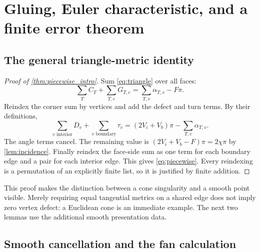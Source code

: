 \section{Gluing, Euler characteristic, and a finite error theorem}\label{sec:global}

\subsection{The general triangle-metric identity}

\begin{proof}[Proof of \cref{thm:piecewise_intro}]
Sum \eqref{eq:triangle} over all faces:
\[
\sum_TC_T+\sum_{T,e}G_{T,e}
=\sum_{T,v}\alpha_{T,v}-F\pi.
\]
Reindex the corner sum by vertices and add the defect and turn terms. By their definitions,
\[
\sum_{v\text{ interior}}D_v+\sum_{v\text{ boundary}}\tau_v
=(2V_i+V_b)\pi-\sum_{T,v}\alpha_{T,v}.
\]
The angle terms cancel. The remaining value is
$(2V_i+V_b-F)\pi=2\chi\pi$ by \cref{lem:incidence}.
Finally reindex the face-side sum as one term for each boundary edge and a pair for each interior edge. This gives \eqref{eq:piecewise}. Every reindexing is a permutation of an explicitly finite list, so it is justified by finite addition.
\end{proof}

This proof makes the distinction between a cone singularity and a smooth point visible. Merely requiring equal tangential metrics on a shared edge does not imply zero vertex defect: a Euclidean cone is an immediate example. The next two lemmas use the additional smooth presentation data.

\subsection{Smooth cancellation and the fan calculation}\label{sec:gluing}

